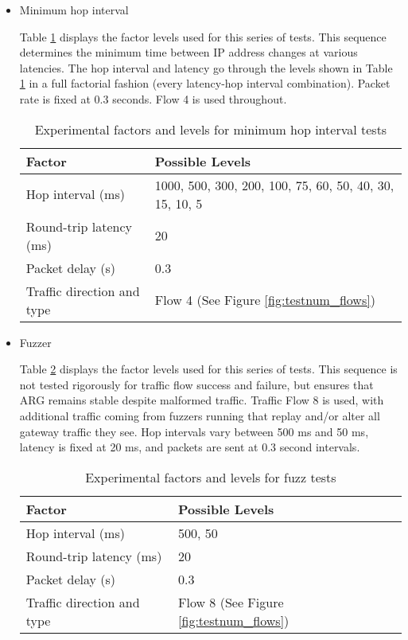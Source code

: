 \begin{itemize}
	\item Minimum hop interval 
	\par Table \ref{tbl:hoprate_factors} displays the factor levels used for this series of tests. This sequence determines the minimum time between \ac{IP} address changes at various latencies. The hop interval and latency go through the levels shown in Table \ref{tbl:hoprate_factors} in a full factorial fashion (every latency-hop interval combination). Packet rate is fixed at 0.3 seconds. Flow 4 is used throughout.

\begin{table}
\caption{Experimental factors and levels for minimum hop interval tests}
\label{tbl:hoprate_factors}
\centering
\begin{tabular}{l|l}
\textbf{Factor} & \textbf{Possible Levels} \\
\hline
Hop interval (ms) & 1000, 500, 300, 200, 100, 75, 60, 50, 40, 30, 15, 10, 5\\
Round-trip latency (ms) & 20\\
Packet delay (s) & 0.3\\
Traffic direction and type & Flow 4 (See Figure \ref{fig:testnum_flows})
\end{tabular}
\end{table}

	\item Fuzzer
	\par Table \ref{tbl:fuzz_factors} displays the factor levels used for this series of tests. This sequence is not tested rigorously for traffic flow success and failure, but ensures that \ac{ARG} remains stable despite malformed traffic. Traffic Flow 8 is used, with additional traffic coming from fuzzers running that replay and/or alter all gateway traffic they see. Hop intervals vary between 500 ms and 50 ms, latency is fixed at 20 ms, and packets are sent at 0.3 second intervals.

\begin{table}
\caption{Experimental factors and levels for fuzz tests}
\label{tbl:fuzz_factors}
\centering
\begin{tabular}{l|l}
\textbf{Factor} & \textbf{Possible Levels} \\
\hline
Hop interval (ms) & 500, 50\\
Round-trip latency (ms) & 20\\
Packet delay (s) & 0.3\\
Traffic direction and type & Flow 8 (See Figure \ref{fig:testnum_flows})
\end{tabular}
\end{table}
\end{itemize}

